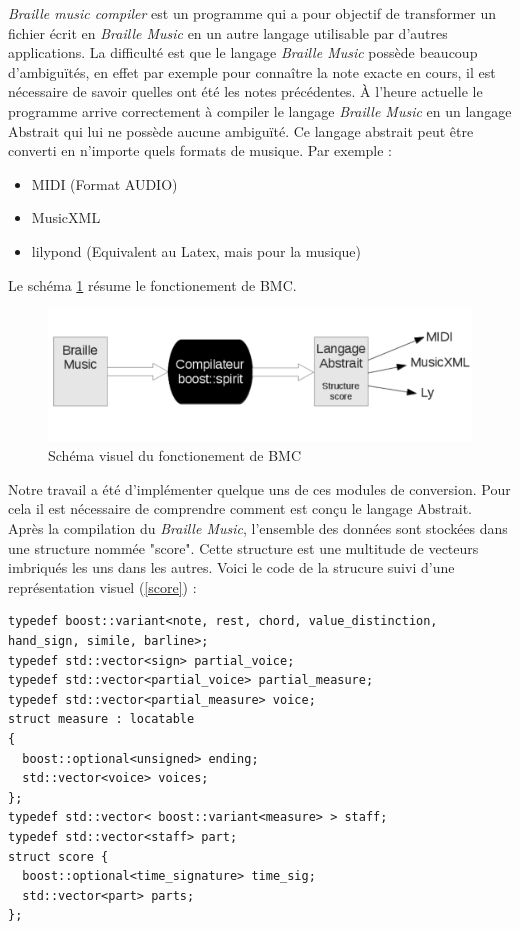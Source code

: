 
\textit{Braille music compiler} est un programme qui a pour objectif
de transformer un fichier écrit en \textit{Braille Music} en un autre
langage utilisable par d'autres applications. La difficulté est que le
langage \textit{Braille Music} possède beaucoup d'ambiguïtés, en effet
par exemple pour connaître la note exacte en cours, il est nécessaire
de savoir quelles ont été les notes précédentes. \`A l'heure actuelle
le programme arrive correctement à compiler le langage \textit{Braille
  Music} en un langage Abstrait qui lui ne possède aucune
ambiguïté. Ce langage abstrait peut être converti en n'importe quels
formats de musique. Par exemple :

\begin{itemize}
\item MIDI (Format AUDIO)
\item MusicXML 
\item lilypond (Equivalent au Latex, mais pour la musique)
\end{itemize}
Le schéma \ref{compiler} résume le fonctionement de BMC.

\begin{figure}[!h]
  \centering
  \includegraphics[width=1\textwidth]{images/fonction-bmc.png}
  \caption{Schéma visuel du fonctionement de BMC}
  \label{compiler}
\end{figure}

Notre travail a été d'implémenter quelque uns de ces modules de
conversion. Pour cela il est nécessaire de comprendre comment est
conçu le langage Abstrait. Après la compilation du \textit{Braille
  Music}, l'ensemble des données sont stockées dans une structure
nommée "score". Cette structure est une multitude de vecteurs
imbriqués les uns dans les autres. Voici le code de la strucure suivi
d'une représentation visuel (\ref{score}) :

\begin{verbatim}
typedef boost::variant<note, rest, chord, value_distinction, hand_sign, simile, barline>;
typedef std::vector<sign> partial_voice;
typedef std::vector<partial_voice> partial_measure;
typedef std::vector<partial_measure> voice;
struct measure : locatable
{
  boost::optional<unsigned> ending;
  std::vector<voice> voices;
};
typedef std::vector< boost::variant<measure> > staff;
typedef std::vector<staff> part;
struct score {
  boost::optional<time_signature> time_sig;
  std::vector<part> parts;
};
\end{verbatim}

